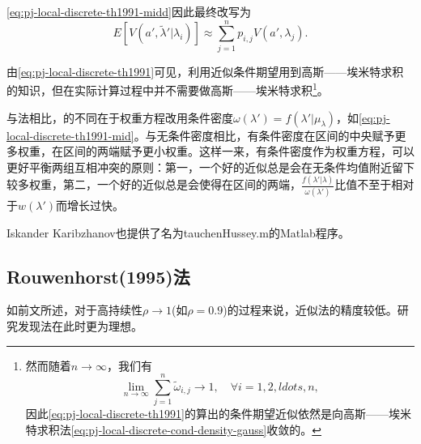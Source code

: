 \begin{subappendices}
\eqref{eq:pj-local-discrete-th1991-midd}因此最终改写为
  \begin{equation}
    \label{eq:pj-local-discrete-th1991}
    E \left[ V \left( a', \tilde{\lambda}' | \lambda_i \right) \right] \approx \sum_{j=1}^{n} p_{i,j} V \left( a',\lambda_j \right).
  \end{equation}

由\eqref{eq:pj-local-discrete-th1991}可见，利用\cite{Tauchen:1991iv}近似条件期望用到高斯——埃米特求积的知识，但在实际计算过程中并不需要做高斯——埃米特求积\footnote{然而随着$n \rightarrow \infty$，我们有
\begin{equation*}
\lim_{n \rightarrow \infty} \sum_{j=1}^{n} \tilde{\omega}_{i,j} \rightarrow 1, \quad \forall i = 1,2,ldots,n,
\end{equation*}
因此\eqref{eq:pj-local-discrete-th1991}的\cite{Tauchen:1991iv}算出的条件期望近似依然是向高斯——埃米特求积法\eqref{eq:pj-local-discrete-cond-density-gauss}收敛的。}。

与\cite{Tauchen:1986gi}法相比，\cite{Tauchen:1991iv}的不同在于权重方程改用条件密度$\omega \left( \lambda' \right) = f \left( \lambda' | \mu_{\lambda} \right)$，如\eqref{eq:pj-local-discrete-th1991-mid}。与无条件密度相比，有条件密度在区间的中央赋予更多权重，在区间的两端赋予更小权重。这样一来，有条件密度作为权重方程，可以更好平衡两组互相冲突的原则：第一，一个好的近似总是会在无条件均值附近留下较多权重，第二，一个好的近似总是会使得在区间的两端，$\frac{f\left( \lambda' | \lambda \right)}{\omega(\lambda')}$比值不至于相对于$w(\lambda')$而增长过快。

Iskander Karibzhanov也提供了名为tauchenHussey.m的Matlab程序。

\subsection{Rouwenhorst(1995)法}
\label{sec:pj-local-discretization-rouwenhorst95}

如前文所述，对于高持续性$\rho \rightarrow 1$(如$\rho=0.9$)的过程来说，\cite{Tauchen:1986gi}近似法的精度较低。\cite{Kopecky:2010du}研究发现\cite{Rouwenhorst:1995tq}法在此时更为理想。


\end{subappendices}
